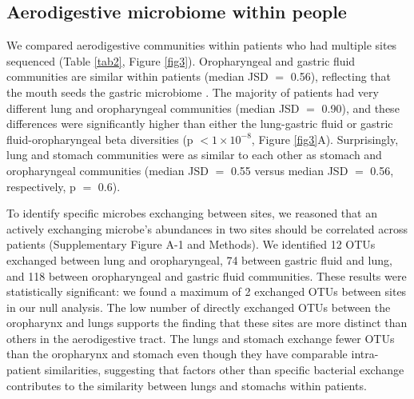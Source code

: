 

\subsection{Aerodigestive microbiome within people}

We compared aerodigestive communities within patients who had multiple sites sequenced (Table \ref{tab2}, Figure \ref{fig3}).
Oropharyngeal and gastric fluid communities are similar within patients (median JSD $=$ 0.56), reflecting that the mouth seeds the gastric microbiome \cite{Bassis2015source,Charlson2011topographical}.
The majority of patients had very different lung and oropharyngeal communities (median JSD $=$ 0.90), and these differences were significantly higher than either the lung-gastric fluid or gastric fluid-oropharyngeal beta diversities (p $< 1 \times 10^{-8}$, Figure \ref{fig3}A).
Surprisingly, lung and stomach communities were as similar to each other as stomach and oropharyngeal communities (median JSD $=$ 0.55 versus median JSD $=$ 0.56, respectively, p $=$ 0.6).

To identify specific microbes exchanging between sites, we reasoned that an actively exchanging microbe's abundances in two sites should be correlated across patients (Supplementary Figure A-1 and Methods).
We identified 12 OTUs exchanged between lung and oropharyngeal, 74 between gastric fluid and lung, and 118 between oropharyngeal and gastric fluid communities.
These results were statistically significant: we found a maximum of 2 exchanged OTUs between sites in our null analysis.
The low number of directly exchanged OTUs between the oropharynx and lungs supports the finding that these sites are more distinct than others in the aerodigestive tract.
The lungs and stomach exchange fewer OTUs than the oropharynx and stomach even though they have comparable intra-patient similarities, suggesting that factors other than specific bacterial exchange contributes to the similarity between lungs and stomachs within patients.

